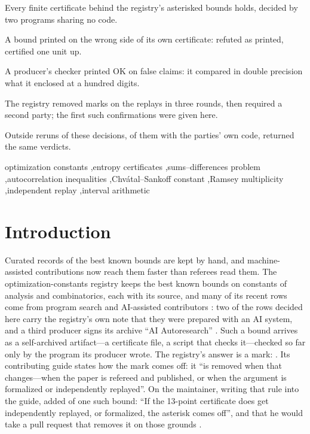 \documentclass[preprint,11pt,authoryear,a4paper]{elsarticle}
\begin{document}
\begin{frontmatter}
\begin{highlights}
\item Every finite certificate behind the registry's asterisked bounds holds, decided by two programs sharing no code.
\item A bound printed on the wrong side of its own certificate: refuted as printed, certified one unit up.
\item A producer's checker printed OK on false claims: it compared in double precision what it enclosed at a hundred digits.
\item The registry removed \MtRgMarksTotalWord{} marks on the replays in three rounds, then required a second party; the first such confirmations were given here.
\item Outside reruns of these decisions, \OcOutOwn{} of them with the parties' own code, returned the same verdicts.
\end{highlights}

\begin{keyword}
optimization constants \sep entropy certificates \sep sums--differences problem \sep autocorrelation inequalities \sep Chv\'atal--Sankoff constant \sep Ramsey multiplicity \sep independent replay \sep interval arithmetic
\end{keyword}

\end{frontmatter}

\section{Introduction}\label{sec:intro}

Curated records of the best known bounds are kept by hand, and machine-assisted contributions now reach them faster than referees read them. The optimization-constants registry \citep{OptConst} keeps the best known bounds on \MtRgConstants{} constants of analysis and combinatorics, each with its source, and many of its recent rows come from program search and AI-assisted contributors \citep{GGSWT25,RomeraParedes24,Novikov25}: two of the rows decided here carry the registry's own note that they were prepared with an AI system, and a third producer signs its archive ``AI Autoresearch'' \citep{NumaroC71}. Such a bound arrives as a self-archived artifact---a certificate file, a script that checks it---checked so far only by the program its producer wrote. The registry's answer is a mark: \OcStarNote{} \citep{OptConst}. Its contributing guide states how the mark comes off: it ``is removed when that changes---when the paper is refereed and published, or when the argument is formalized or independently replayed''. On \MtRgRuleDate{} the maintainer, writing that rule into the guide, added of one such bound: ``If the 13-point certificate does get independently replayed, or formalized, the asterisk comes off'', and that he would take a pull request that removes it on those grounds \citep{OptConstRule}.
\end{document}
